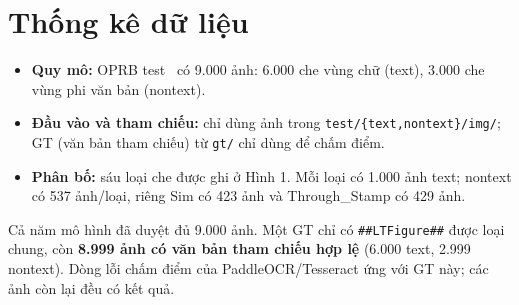 \section{Thống kê dữ liệu}
\begin{itemize}
\item \textbf{Quy mô:} OPRB test~\cite{oprb} có 9.000 ảnh: 6.000 che vùng chữ
(text), 3.000 che vùng phi văn bản (nontext).
\item \textbf{Đầu vào và tham chiếu:} chỉ dùng ảnh trong
\texttt{test/\{text,nontext\}/img/}; GT (văn bản tham chiếu) từ \texttt{gt/}
chỉ dùng để chấm điểm.
\item \textbf{Phân bố:} sáu loại che được ghi ở Hình 1. Mỗi loại có 1.000 ảnh
text; nontext có 537 ảnh/loại, riêng Sim có 423 ảnh và Through\_Stamp có 429 ảnh.
\end{itemize}
Cả năm mô hình đã duyệt đủ 9.000 ảnh. Một GT chỉ có \texttt{\#\#LTFigure\#\#}
được loại chung, còn \textbf{8.999 ảnh có văn bản tham chiếu hợp lệ}
(6.000 text, 2.999 nontext). Dòng lỗi chấm điểm của PaddleOCR/Tesseract ứng với
GT này; các ảnh còn lại đều có kết quả.
